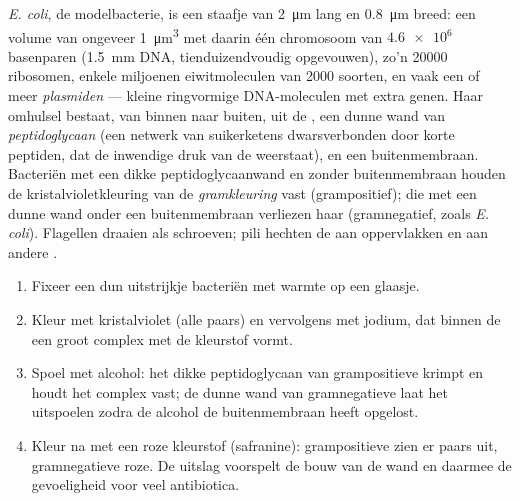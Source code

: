 \begin{proposition}[De bacteriecel]\label{prop:b1:cell-unit-of-life:bacterium}
\emph{E. coli}, de modelbacterie, is een staafje van \qty{2}{\micro m} lang en
\qty{0.8}{\micro m} breed: een volume van ongeveer \qty{1}{\micro m^3} met daarin
één chromosoom van $\num{4.6e6}$ basenparen (\qty{1.5}{mm} DNA, tienduizendvoudig
opgevouwen), zo'n \num{20000} ribosomen, enkele miljoenen eiwitmoleculen van
\num{2000} soorten, en vaak een of meer
\emph{plasmiden} --- kleine ringvormige DNA-moleculen met extra
genen. Haar omhulsel bestaat, van binnen naar buiten, uit de , een
dunne wand van \emph{peptidoglycaan} (een netwerk van
suikerketens dwarsverbonden door korte peptiden, dat de inwendige druk van de 
weerstaat), en een buitenmembraan. Bacteriën met een dikke peptidoglycaanwand en
zonder buitenmembraan houden de kristalvioletkleuring van de
\emph{gramkleuring} vast (grampositief); die met een dunne
wand onder een buitenmembraan verliezen haar (gramnegatief, zoals
\emph{E. coli}). Flagellen draaien als schroeven; pili hechten de  aan
oppervlakken en aan andere .
\end{proposition}

\begin{method}[De gramkleuring]\label{met:b1:cell-unit-of-life:gram}
\begin{enumerate}
  \item Fixeer een dun uitstrijkje bacteriën met warmte op een glaasje.
  \item Kleur met kristalviolet (alle  paars) en vervolgens met
        jodium, dat binnen de  een groot complex met de kleurstof
        vormt.
  \item Spoel met alcohol: het dikke peptidoglycaan van grampositieve
         krimpt en houdt het complex vast; de dunne wand van
        gramnegatieve  laat het uitspoelen zodra de alcohol de
        buitenmembraan heeft opgelost.
  \item Kleur na met een roze kleurstof (safranine): grampositieve 
        zien er paars uit, gramnegatieve roze. De uitslag voorspelt de
        bouw van de wand en daarmee de gevoeligheid voor veel
        antibiotica.
\end{enumerate}
\end{method}


